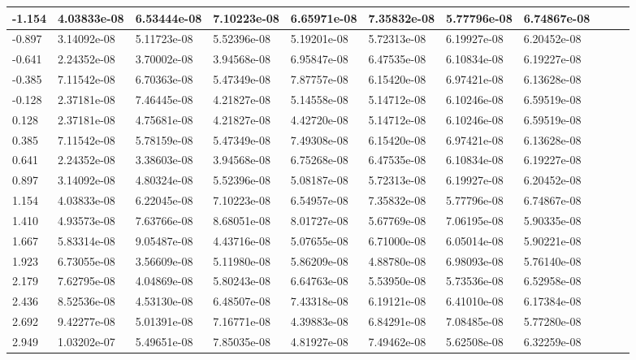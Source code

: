 \documentclass{article}
\begin{document}
\begin{table}[H]
\begin{adjustwidth}{-0.9in}{-.7in}
\begin{tabular}{|l|l|l|l|l|l|l|l|l|l|l|}
-1.154 & 4.03833e-08 & 6.53444e-08 & 7.10223e-08 & 6.65971e-08 & 7.35832e-08 & 5.77796e-08 & 6.74867e-08 \\ \hline
-0.897 & 3.14092e-08 & 5.11723e-08 & 5.52396e-08 & 5.19201e-08 & 5.72313e-08 & 6.19927e-08 & 6.20452e-08 \\ \hline
-0.641 & 2.24352e-08 & 3.70002e-08 & 3.94568e-08 & 6.95847e-08 & 6.47535e-08 & 6.10834e-08 & 6.19227e-08 \\ \hline
-0.385 & 7.11542e-08 & 6.70363e-08 & 5.47349e-08 & 7.87757e-08 & 6.15420e-08 & 6.97421e-08 & 6.13628e-08 \\ \hline
-0.128 & 2.37181e-08 & 7.46445e-08 & 4.21827e-08 & 5.14558e-08 & 5.14712e-08 & 6.10246e-08 & 6.59519e-08 \\ \hline
0.128 & 2.37181e-08 & 4.75681e-08 & 4.21827e-08 & 4.42720e-08 & 5.14712e-08 & 6.10246e-08 & 6.59519e-08 \\ \hline
0.385 & 7.11542e-08 & 5.78159e-08 & 5.47349e-08 & 7.49308e-08 & 6.15420e-08 & 6.97421e-08 & 6.13628e-08 \\ \hline
0.641 & 2.24352e-08 & 3.38603e-08 & 3.94568e-08 & 6.75268e-08 & 6.47535e-08 & 6.10834e-08 & 6.19227e-08 \\ \hline
0.897 & 3.14092e-08 & 4.80324e-08 & 5.52396e-08 & 5.08187e-08 & 5.72313e-08 & 6.19927e-08 & 6.20452e-08 \\ \hline
1.154 & 4.03833e-08 & 6.22045e-08 & 7.10223e-08 & 6.54957e-08 & 7.35832e-08 & 5.77796e-08 & 6.74867e-08 \\ \hline
1.410 & 4.93573e-08 & 7.63766e-08 & 8.68051e-08 & 8.01727e-08 & 5.67769e-08 & 7.06195e-08 & 5.90335e-08 \\ \hline
1.667 & 5.83314e-08 & 9.05487e-08 & 4.43716e-08 & 5.07655e-08 & 6.71000e-08 & 6.05014e-08 & 5.90221e-08 \\ \hline
1.923 & 6.73055e-08 & 3.56609e-08 & 5.11980e-08 & 5.86209e-08 & 4.88780e-08 & 6.98093e-08 & 5.76140e-08 \\ \hline
2.179 & 7.62795e-08 & 4.04869e-08 & 5.80243e-08 & 6.64763e-08 & 5.53950e-08 & 5.73536e-08 & 6.52958e-08 \\ \hline
2.436 & 8.52536e-08 & 4.53130e-08 & 6.48507e-08 & 7.43318e-08 & 6.19121e-08 & 6.41010e-08 & 6.17384e-08 \\ \hline
2.692 & 9.42277e-08 & 5.01391e-08 & 7.16771e-08 & 4.39883e-08 & 6.84291e-08 & 7.08485e-08 & 5.77280e-08 \\ \hline
2.949 & 1.03202e-07 & 5.49651e-08 & 7.85035e-08 & 4.81927e-08 & 7.49462e-08 & 5.62508e-08 & 6.32259e-08 \\ \hline

\end{tabular}
\end{adjustwidth}
\end{table}
\end{document}

